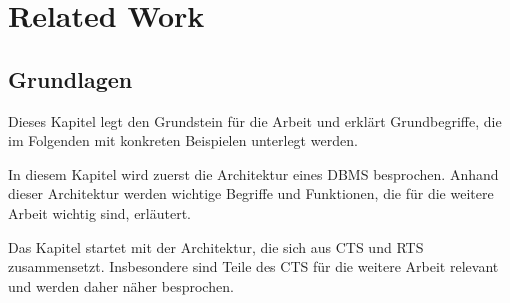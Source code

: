 \chapter{Related Work}


\section{Grundlagen}
Dieses Kapitel legt den Grundstein für die Arbeit und erklärt Grundbegriffe, die im Folgenden mit konkreten Beispielen unterlegt werden.

In diesem Kapitel wird zuerst die Architektur eines \ac{DBMS} besprochen. Anhand dieser Architektur werden wichtige Begriffe und Funktionen, die für die weitere Arbeit wichtig sind, erläutert.

Das Kapitel startet mit der Architektur, die sich aus \ac{CTS} und \ac{RTS} zusammensetzt. Insbesondere sind Teile des \ac{CTS} für die weitere Arbeit relevant und werden daher näher besprochen. 














